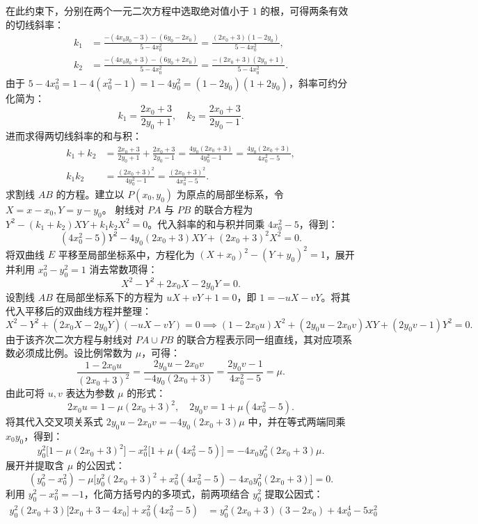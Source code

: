 \begin{solution}
在此约束下，分别在两个一元二次方程中选取绝对值小于 $1$ 的根，可得两条有效的切线斜率：
\begin{align*}
k_1 &= \frac{-(4x_0y_0 - 3) - (6y_0 - 2x_0)}{5 - 4x_0^2} = \frac{(2x_0 + 3)(1 - 2y_0)}{5 - 4x_0^2}, \\
k_2 &= \frac{-(4x_0y_0 + 3) - (6y_0 + 2x_0)}{5 - 4x_0^2} = \frac{-(2x_0 + 3)(2y_0 + 1)}{5 - 4x_0^2}.
\end{align*}
由于 $5 - 4x_0^2 = 1 - 4(x_0^2 - 1) = 1 - 4y_0^2 = (1 - 2y_0)(1 + 2y_0)$，斜率可约分化简为：
\[ k_1 = \frac{2x_0 + 3}{2y_0 + 1}, \quad k_2 = \frac{2x_0 + 3}{2y_0 - 1}. \]
进而求得两切线斜率的和与积：
\begin{align*}
k_1 + k_2 &= \frac{2x_0 + 3}{2y_0 + 1} + \frac{2x_0 + 3}{2y_0 - 1} = \frac{4y_0(2x_0 + 3)}{4y_0^2 - 1} = \frac{4y_0(2x_0 + 3)}{4x_0^2 - 5}, \\
k_1 k_2 &= \frac{(2x_0 + 3)^2}{4y_0^2 - 1} = \frac{(2x_0 + 3)^2}{4x_0^2 - 5}.
\end{align*}
求割线 $AB$ 的方程。建立以 $P(x_0, y_0)$ 为原点的局部坐标系，令 $X = x - x_0, Y = y - y_0$。
射线对 $PA$ 与 $PB$ 的联合方程为 $Y^2 - (k_1 + k_2)XY + k_1 k_2 X^2 = 0$。代入斜率的和与积并同乘 $4x_0^2 - 5$，得到：
\[ (4x_0^2 - 5)Y^2 - 4y_0(2x_0 + 3)XY + (2x_0 + 3)^2 X^2 = 0. \]
将双曲线 $E$ 平移至局部坐标系中，方程化为 $(X + x_0)^2 - (Y + y_0)^2 = 1$，展开并利用 $x_0^2 - y_0^2 = 1$ 消去常数项得：
\[ X^2 - Y^2 + 2x_0 X - 2y_0 Y = 0. \]
设割线 $AB$ 在局部坐标系下的方程为 $uX + vY + 1 = 0$，即 $1 = -uX - vY$。将其代入平移后的双曲线方程并整理：
\[ X^2 - Y^2 + (2x_0 X - 2y_0 Y)(-uX - vY) = 0 \implies (1 - 2x_0 u)X^2 + (2y_0 u - 2x_0 v)XY + (2y_0 v - 1)Y^2 = 0. \]
由于该齐次二次方程与射线对 $PA \cup PB$ 的联合方程表示同一组直线，其对应项系数必须成比例。设比例常数为 $\mu$，可得：
\[ \frac{1 - 2x_0 u}{(2x_0 + 3)^2} = \frac{2y_0 u - 2x_0 v}{-4y_0(2x_0 + 3)} = \frac{2y_0 v - 1}{4x_0^2 - 5} = \mu. \]
由此可将 $u, v$ 表达为参数 $\mu$ 的形式：
\[ 2x_0 u = 1 - \mu(2x_0 + 3)^2, \quad 2y_0 v = 1 + \mu(4x_0^2 - 5). \]
将其代入交叉项关系式 $2y_0 u - 2x_0 v = -4y_0(2x_0 + 3)\mu$ 中，并在等式两端同乘 $x_0 y_0$，得到：
\[ y_0^2 \big[ 1 - \mu(2x_0 + 3)^2 \big] - x_0^2 \big[ 1 + \mu(4x_0^2 - 5) \big] = -4x_0 y_0^2 (2x_0 + 3) \mu. \]
展开并提取含 $\mu$ 的公因式：
\[ (y_0^2 - x_0^2) - \mu \big[ y_0^2(2x_0 + 3)^2 + x_0^2(4x_0^2 - 5) - 4x_0 y_0^2 (2x_0 + 3) \big] = 0. \]
利用 $y_0^2 - x_0^2 = -1$，化简方括号内的多项式，前两项结合 $y_0^2$ 提取公因式：
\begin{align*}
y_0^2(2x_0 + 3)\big[ 2x_0 + 3 - 4x_0 \big] + x_0^2(4x_0^2 - 5) &= y_0^2(2x_0 + 3)(3 - 2x_0) + 4x_0^4 - 5x_0^2 \\

\end{align*}
\end{solution}
